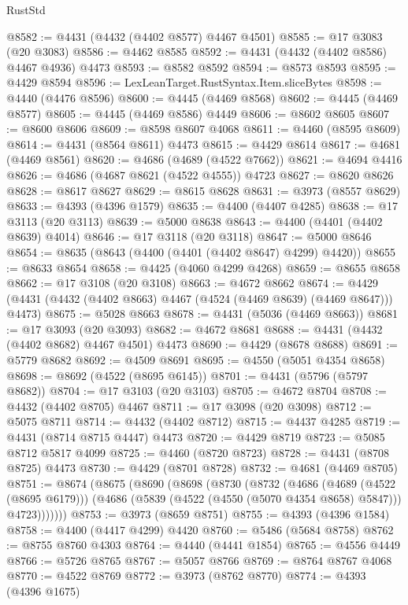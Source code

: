 \begin{lexlean}{RustStd}
\begin{coremodule}
@8582 := @4431 (@4432 (@4402 @8577) @4467 @4501)
@8585 := @17 @3083 (@20 @3083)
@8586 := @4462 @8585
@8592 := @4431 (@4432 (@4402 @8586) @4467 @4936) @4473
@8593 := @8582 @8592
@8594 := @8573 @8593
@8595 := @4429 @8594
@8596 := LexLeanTarget.RustSyntax.Item.sliceBytes
@8598 := @4440 (@4476 @8596)
@8600 := @4445 (@4469 @8568)
@8602 := @4445 (@4469 @8577)
@8605 := @4445 (@4469 @8586) @4449
@8606 := @8602 @8605
@8607 := @8600 @8606
@8609 := @8598 @8607 @4068
@8611 := @4460 (@8595 @8609)
@8614 := @4431 (@8564 @8611) @4473
@8615 := @4429 @8614
@8617 := @4681 (@4469 @8561)
@8620 := @4686 (@4689 (@4522 @7662))
@8621 := @4694 @4416
@8626 := @4686 (@4687 @8621 (@4522 @4555)) @4723
@8627 := @8620 @8626
@8628 := @8617 @8627
@8629 := @8615 @8628
@8631 := @3973 (@8557 @8629)
@8633 := @4393 (@4396 @1579)
@8635 := @4400 (@4407 @4285)
@8638 := @17 @3113 (@20 @3113)
@8639 := @5000 @8638
@8643 := @4400 (@4401 (@4402 @8639) @4014)
@8646 := @17 @3118 (@20 @3118)
@8647 := @5000 @8646
@8654 := @8635 (@8643 (@4400 (@4401 (@4402 @8647) @4299) @4420))
@8655 := @8633 @8654
@8658 := @4425 (@4060 @4299 @4268)
@8659 := @8655 @8658
@8662 := @17 @3108 (@20 @3108)
@8663 := @4672 @8662
@8674 := @4429 (@4431 (@4432 (@4402 @8663) @4467 (@4524 (@4469 @8639) (@4469 @8647))) @4473)
@8675 := @5028 @8663
@8678 := @4431 (@5036 (@4469 @8663))
@8681 := @17 @3093 (@20 @3093)
@8682 := @4672 @8681
@8688 := @4431 (@4432 (@4402 @8682) @4467 @4501) @4473
@8690 := @4429 (@8678 @8688)
@8691 := @5779 @8682
@8692 := @4509 @8691
@8695 := @4550 (@5051 @4354 @8658)
@8698 := @8692 (@4522 (@8695 @6145))
@8701 := @4431 (@5796 (@5797 @8682))
@8704 := @17 @3103 (@20 @3103)
@8705 := @4672 @8704
@8708 := @4432 (@4402 @8705) @4467
@8711 := @17 @3098 (@20 @3098)
@8712 := @5075 @8711
@8714 := @4432 (@4402 @8712)
@8715 := @4437 @4285
@8719 := @4431 (@8714 @8715 @4447) @4473
@8720 := @4429 @8719
@8723 := @5085 @8712 @5817 @4099
@8725 := @4460 (@8720 @8723)
@8728 := @4431 (@8708 @8725) @4473
@8730 := @4429 (@8701 @8728)
@8732 := @4681 (@4469 @8705)
@8751 := @8674
    (@8675
      (@8690
        (@8698
          (@8730
            (@8732
              (@4686
                (@4689 (@4522 (@8695 @6179)))
                (@4686 (@5839 (@4522 (@4550 (@5070 @4354 @8658) @5847))) @4723)))))))
@8753 := @3973 (@8659 @8751)
@8755 := @4393 (@4396 @1584)
@8758 := @4400 (@4417 @4299) @4420
@8760 := @5486 (@5684 @8758)
@8762 := @8755 @8760 @4303
@8764 := @4440 (@4441 @1854)
@8765 := @4556 @4449
@8766 := @5726 @8765
@8767 := @5057 @8766
@8769 := @8764 @8767 @4068
@8770 := @4522 @8769
@8772 := @3973 (@8762 @8770)
@8774 := @4393 (@4396 @1675)

\end{coremodule}
\end{lexlean}
